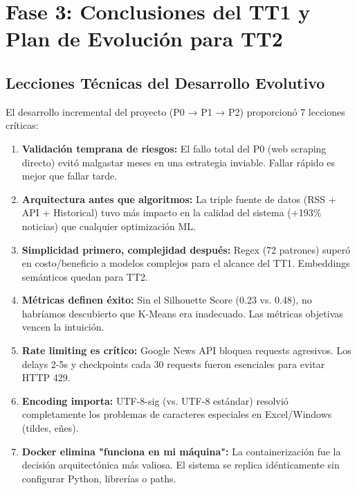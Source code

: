 \section{Fase 3: Conclusiones del TT1 y Plan de Evolución para TT2}
\label{sec:prototipo3}

\subsection{Lecciones Técnicas del Desarrollo Evolutivo}

El desarrollo incremental del proyecto (P0 → P1 → P2) proporcionó 7 lecciones críticas:

\begin{enumerate}
    \item \textbf{Validación temprana de riesgos:} El fallo total del P0 (web scraping directo) evitó malgastar meses en una estrategia inviable. Fallar rápido es mejor que fallar tarde.
    
    \item \textbf{Arquitectura antes que algoritmos:} La triple fuente de datos (RSS + API + Historical) tuvo más impacto en la calidad del sistema (+193\% noticias) que cualquier optimización ML.
    
    \item \textbf{Simplicidad primero, complejidad después:} Regex (72 patrones) superó en costo/beneficio a modelos complejos para el alcance del TT1. Embeddings semánticos quedan para TT2.
    
    \item \textbf{Métricas definen éxito:} Sin el Silhouette Score (0.23 vs. 0.48), no habríamos descubierto que K-Means era inadecuado. Las métricas objetivas vencen la intuición.
    
    \item \textbf{Rate limiting es crítico:} Google News API bloquea requests agresivos. Los delays 2-5s y checkpoints cada 30 requests fueron esenciales para evitar HTTP 429.
    
    \item \textbf{Encoding importa:} UTF-8-sig (vs. UTF-8 estándar) resolvió completamente los problemas de caracteres especiales en Excel/Windows (tildes, eñes).
    
    \item \textbf{Docker elimina "funciona en mi máquina":} La containerización fue la decisión arquitectónica más valiosa. El sistema se replica idénticamente sin configurar Python, librerías o paths.
\end{enumerate}

